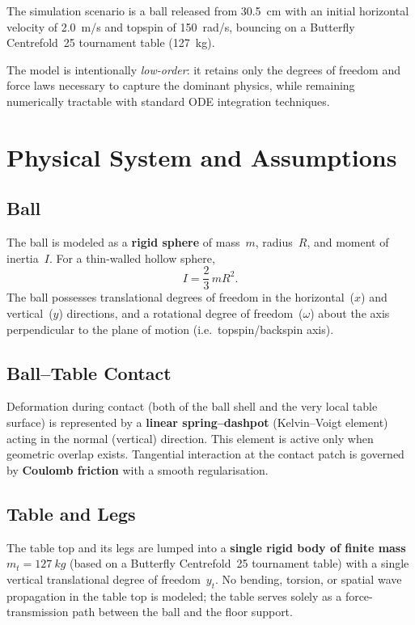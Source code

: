 \documentclass[11pt,a4paper]{article}
\begin{document}
The simulation scenario is a ball released from \SI{30.5}{cm} with an initial
horizontal velocity of \SI{2.0}{m/s} and topspin of \SI{150}{rad/s},
bouncing on a Butterfly Centrefold~25 tournament table (\SI{127}{kg}).

The model is intentionally \emph{low-order}: it retains only the degrees of
freedom and force laws necessary to capture the dominant physics, while
remaining numerically tractable with standard ODE integration techniques.

\section{Physical System and Assumptions}

\subsection{Ball}

The ball is modeled as a \textbf{rigid sphere} of mass~$m$, radius~$R$, and
moment of inertia~$I$. For a thin-walled hollow sphere,
\begin{equation}
  I = \frac{2}{3}\,m R^2.
  \label{eq:moi}
\end{equation}
The ball possesses translational degrees of freedom in the horizontal~($x$) and
vertical~($y$) directions, and a rotational degree of freedom~($\omega$)
about the axis perpendicular to the plane of motion (i.e.\ topspin/backspin
axis).

\subsection{Ball--Table Contact}

Deformation during contact (both of the ball shell and the very local table
surface) is represented by a \textbf{linear spring--dashpot} (Kelvin--Voigt
element) acting in the normal (vertical) direction. This element is active only
when geometric overlap exists. Tangential interaction at the contact patch is
governed by \textbf{Coulomb friction} with a smooth regularisation.

\subsection{Table and Legs}

The table top and its legs are lumped into a \textbf{single rigid body of
finite mass}~$m_t = \SI{127}{kg}$ (based on a Butterfly Centrefold~25
tournament table) with a single vertical translational degree of
freedom~$y_t$. No bending, torsion, or spatial wave propagation in the table
top is modeled; the table serves solely as a force-transmission path between
the ball and the floor support.
\end{document}
